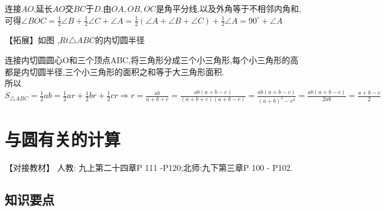 \documentclass[cn,blue,12pt]{elegantbook}
\renewcommand \tkt[1]{{\CJKunderline[hidden=true, skip=true, thickness=1pt]{#1}}}
\begin{document}
\begin{zsyd}
\begin{zsyd}
\begin{note}
            连接\(AO\),延长\(AO\)交\(BC\)于\(D\).由\(OA, OB, OC\)是角平分线,以及外角等于不相邻内角和,可得\(\angle BOC = \frac{1}{2}\angle B+\frac{1}{2}\angle C + \angle A=\frac{1}{2}(\angle A+\angle B+\angle C)+\frac{1}{2}\angle A=90^\circ+\angle A\)
\end{note}
    \item 【拓展】如图 ,\(Rt \triangle ABC\)的内切圆半径\tkt{\(r = \frac{a+b-c}{2}\)}
\begin{note}
            连接内切圆圆心O和三个顶点ABC,将三角形分成三个小三角形,每个小三角形的高都是内切圆半径,三个小三角形的面积之和等于大三角形面积.\\
            所以\(S_{\triangle ABC}=\frac{1}{2}ab=\frac{1}{2}ar+\frac{1}{2}br+\frac{1}{2}cr \Rightarrow r=\frac{ab}{a+b+c}=\frac{ab(a+b-c)}{(a+b+c)(a+b-c)}=\frac{ab(a+b-c)}{(a+b)^2-c^2}=\frac{ab(a+b-c)}{2ab}=\frac{a+b-c}{2}\)
\end{note}
    \end{zsyd}
\end{zsyd}

\chapter{与圆有关的计算}%
\label{cha:与圆有关的计算}

\begin{note}
    【对接教材】 人教: 九上第二十四章P 111 -P120;北师:九下第三章P 100 - P102.
\end{note}
\section{知识要点}%
\label{sec:知识要点}
\end{document}
